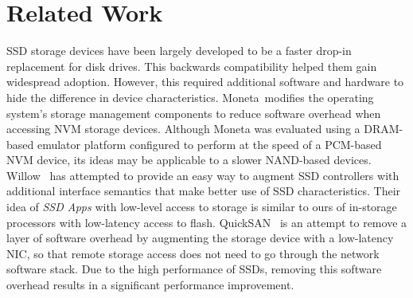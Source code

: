 
\section{Related Work}

\begin{comment}
NAND flash-based storage devices have much different characteristics from
traditional disk based storage systems. Because there are not mechanical
movement involved, access latency is uniformly low, unlike disks that suffer
from high seek latency. An SSD storage device consists of an array of flash
chips organized into buses, and bandwidth can be made very high by having
multiple buses that operate in parallel. NAND flash suffers read-write
performance imbalance, where writes take longer to complete than reads. Flash
read and write can be done at a \emph{page} granularity, which is generally
4~8KB in size. However, before a page can be written, it must be erased, which
can only be done at a \emph{block} granularity, which is a region of hundreds of
pages. NAND flash also suffers from a limited program-erase cycle, in which a
block can only sustain a few thousand erases before it becomes a bad block.
\end{comment}

SSD storage devices have been largely developed to be a faster drop-in replacement for
disk drives. This backwards compatibility helped them gain widespread adoption.
However, this required additional software and hardware to hide the difference
in device characteristics. 
Moneta~\cite{ucsd_moneta}modifies the operating system's storage
management components to reduce software overhead when accessing 
NVM storage devices. Although Moneta was evaluated using a DRAM-based emulator
platform configured to perform at the speed of a PCM-based NVM device, its ideas
may be applicable to a slower NAND-based devices.
Willow~\cite{ucsd_willow} has attempted to
provide an easy way to augment SSD controllers with additional interface
semantics that make better use of SSD characteristics. Their idea of \emph{SSD
Apps} with low-level access to storage is similar to ours of in-storage
processors with low-latency access to flash.
QuickSAN~\cite{ucsd_quiclsan} is an attempt to remove a layer of software
overhead by augmenting the storage device with a low-latency NIC, so that remote
storage access does not need to go through the network software stack. Due to
the high performance of SSDs, removing this software overhead results in a
significant performance improvement.

